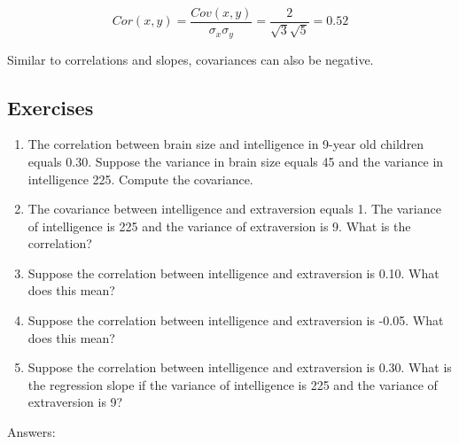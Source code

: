 \documentclass[]{report}\usepackage[]{graphicx}\usepackage[]{color}
\begin{document}
\begin{equation}
Cor(x,y)= \frac{Cov(x,y)} { \sigma_x \sigma_y}= \frac{2} { \sqrt{3} \sqrt{5}}=0.52
\end{equation}

Similar to correlations and slopes, covariances can also be negative.


\subsection{Exercises}

\begin{enumerate}

\item The correlation between brain size and intelligence in 9-year old children equals 0.30. Suppose the variance in brain size equals 45 and the variance in intelligence 225. Compute the covariance.



\item The covariance between intelligence and extraversion equals 1. The variance of intelligence is 225 and the variance of extraversion is 9. What is the correlation?




\item Suppose the correlation between intelligence and extraversion is 0.10. What does this mean?



\item Suppose the correlation between intelligence and extraversion is -0.05. What does this mean?




\item Suppose the correlation between intelligence and extraversion is 0.30. What is the regression slope if the variance of intelligence is 225 and the variance of extraversion is 9?



\end{enumerate}

Answers:
\end{document}
